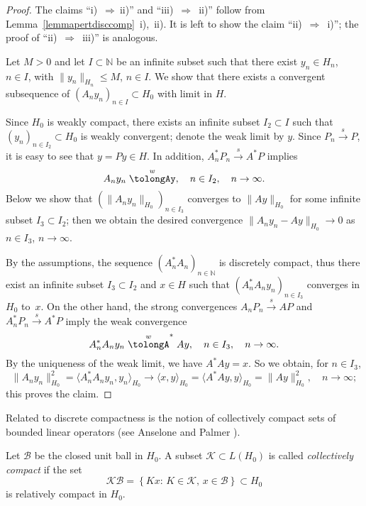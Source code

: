 \documentclass[a4paper,reqno]{amsart}
\begin{document}
{\begin{proof}
The claims ``i)~${\Longrightarrow}~$ii)'' and ``iii)~${\Longrightarrow}$~ii)'' follow from Lemma~\ref{lemmapertdisccomp}~i),~ii).
It is left to show the claim ``ii)~${\Longrightarrow}$~i)''; the proof of ``ii)~${\Longrightarrow}$~iii)'' is analogous.

Let $M>0$ and let $I\subset{\mathbb{N}}$ be an infinite subset such that there exist $y_n\in H_n$, \linebreak
$n\in I$, with $\|y_n\|_{H_n}\leq M$, $n\in I$.
We show that there exists a convergent subsequence of $(A_ny_n)_{n\in I}\subset H_0$ with limit in $H$.

Since $H_0$ is weakly compact, there exists an infinite subset $I_2\subset I$ such that $(y_n)_{n\in I_2}\subset H_0$ is weakly convergent; denote the weak limit by $y$.
Since $P_n{\stackrel{s}{\rightarrow}} P$, it is easy to see that $y=Py\in H$.
In addition, $A_n^*P_n{\stackrel{s}{\rightarrow}} A^*P$ implies $$A_ny_n\stackrel{w}\tolongAy, \quad n\in I_2, \quad n\to\infty.$$
Below we show that $(\|A_ny_n\|_{H_0})_{n\in I_3}$ converges to $\|Ay\|_{H_0}$ for some infinite subset $I_3\subset I_2$; then we obtain the desired convergence $\|A_ny_n-Ay\|_{H_0}\to 0$ as $n\in I_3$, $n\to\infty$.

By the assumptions, the sequence $\left(A_n^*A_n\right)_{n\in{\mathbb{N}}}$ is discretely compact, thus there exist an infinite subset $I_3\subset I_2$ and $x\in H$ such that $\left(A_n^*A_ny_n\right)_{n\in I_3}$ converges in $H_0$ to~$x$.
On the other hand, the strong convergences $A_nP_n{\stackrel{s}{\rightarrow}} AP$ and $A_n^*P_n{\stackrel{s}{\rightarrow}} A^*P$ imply the weak convergence 
$$A_n^*A_ny_n\stackrel{w}\tolongA^*Ay, \quad n\in I_3, \quad n\to\infty.$$ 
By the uniqueness of the weak limit, we have $A^*Ay=x$.
So we obtain, for $n\in I_3$,
$$\|A_ny_n\|_{H_0}^2=\langle A_n^*A_ny_n,y_n\rangle_{H_0}{\longrightarrow}\langle x,y\rangle_{H_0}=\langle A^*Ay,y\rangle_{H_0}=\|Ay\|_{H_0}^2,\quad n\to\infty;$$
this proves the claim.
\end{proof}

Related to discrete compactness is the notion of {collectively compact} sets of bounded linear operators (see  Anselone and Palmer \cite{anselonepalmer}).

\begin{definition}\label{defcollectivelycomp}
 Let $\mathcal{B}$ be  the closed unit ball in $H_0$. 
 A subset $\mathcal{K}\subset L(H_0)$ is called \emph{collectively compact} if the set 
$$\mathcal K\mathcal B=\left\{Kx:\,K\in\mathcal K, \,x\in \mathcal B\right\}\subset H_0$$ is relatively compact in $H_0$.
\end{definition}

}
\end{document}
